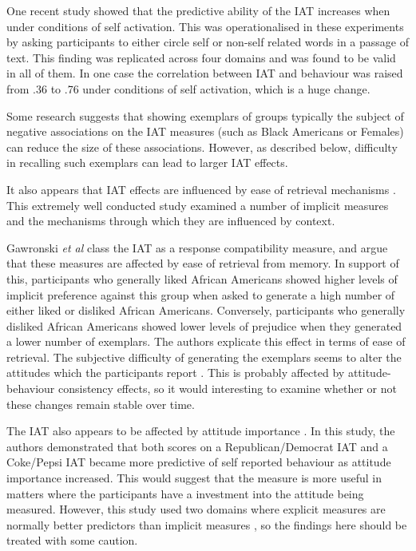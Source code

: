 One recent study \cite{Perugini2007} showed that the predictive ability of the IAT increases when under conditions of self activation. This was operationalised in these experiments by asking participants to either circle self or non-self related words in a passage of text. This finding was replicated across four domains and was found to be valid in all of them. In one case the correlation between IAT and behaviour was raised from .36 to .76 under conditions of self activation, which is a huge change. 

Some research \cite{Dasgupta2001} suggests that showing exemplars of groups typically the subject of negative associations on the IAT measures (such as Black Americans or Females) can reduce the size of these associations. However, as described below, difficulty in recalling such exemplars can lead to larger IAT effects. 

It also appears that IAT effects are influenced by ease of retrieval mechanisms \cite{Gawronski2005}. This extremely well conducted study examined a number of implicit measures and the mechanisms through which they are influenced by context. 

Gawronski \textit{et al} class the IAT as a response compatibility measure, and argue that these measures are affected by ease of retrieval from memory. In support of this, participants who generally liked African Americans showed higher levels of implicit preference against this group when asked to generate a high number of either liked or disliked African Americans. Conversely, participants who generally disliked African Americans showed lower levels of prejudice when they generated a lower number of exemplars. The authors explicate this effect in terms of ease of retrieval. The subjective difficulty of generating the exemplars seems to alter the attitudes which the participants report \cite{Kahneman2002}.  %
This is probably affected by attitude-behaviour consistency effects, so it would interesting to examine whether or not these changes remain stable over time.  

The IAT also appears to be affected by attitude importance \cite{Karpinski2005}. In this study, the authors demonstrated that both scores on a Republican/Democrat IAT and a Coke/Pepsi IAT became more predictive of self reported behaviour as attitude importance increased. This would suggest that the measure is more useful in matters where the participants have a investment into the attitude being measured. However, this study used two domains where explicit measures are normally better predictors than implicit measures \cite{Nosek2007d}, so the findings here should be treated with some caution. 

